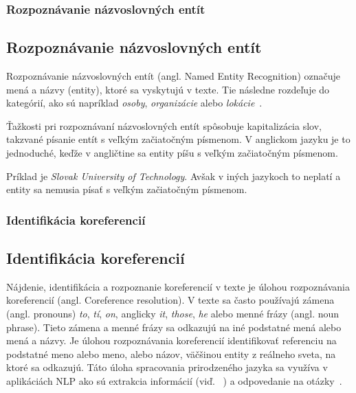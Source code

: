 %
%
{
	\subsubsection{Rozpoznávanie názvoslovných entít}
}
{
	\subsection{Rozpoznávanie názvoslovných entít}
}
\label{subsubsec:ner}
Rozpoznávanie názvoslovných entít (angl. Named Entity Recognition) označuje mená a názvy (entity), ktoré sa vyskytujú v texte. Tie následne rozdeľuje do kategórií, ako sú napríklad \textit{osoby}, \textit{organizácie} alebo \textit{lokácie}~\cite{collobert2011}.

Ťažkosti pri rozpoznávaní názvoslovných entít spôsobuje kapitalizácia slov, takzvané písanie entít s veľkým začiatočným písmenom. V anglickom jazyku je to jednoduché, keďže v angličtine sa entity píšu s veľkým začiatočným písmenom.

Príklad je \textit{Slovak University of Technology}. Avšak v iných jazykoch to neplatí a entity sa nemusia písať s veľkým začiatočným písmenom.

%
%
{
	\subsubsection{Identifikácia koreferencií}
}
{
	\subsection{Identifikácia koreferencií}
}
\label{subsubsec:corefparsing}
Nájdenie, identifikácia a rozpoznanie koreferencií v texte je úlohou rozpoznávania koreferencií (angl. Coreference resolution). V texte sa často používajú zámena (angl. pronouns) \textit{to}, \textit{tí}, \textit{on}, anglicky \textit{it}, \textit{those}, \textit{he} alebo menné frázy (angl. noun phrase). Tieto zámena a menné frázy sa odkazujú na iné podstatné mená alebo mená a názvy. Je úlohou rozpoznávania koreferencií identifikovať referenciu na podstatné meno alebo meno, alebo názov, väčšinou entity z reálneho sveta, na ktoré sa odkazujú. Táto úloha spracovania prirodzeného jazyka sa využíva v aplikáciách NLP ako sú extrakcia informácií (viď. ~) a odpovedanie na otázky~\cite{Bryl}.

